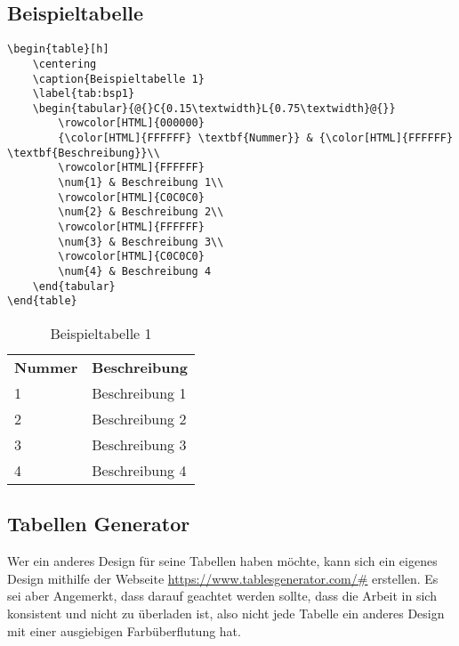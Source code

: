 \subsection{Beispieltabelle}
\begin{lstlisting}[style=latex]
\begin{table}[h]
	\centering
	\caption{Beispieltabelle 1}
	\label{tab:bsp1}
	\begin{tabular}{@{}C{0.15\textwidth}L{0.75\textwidth}@{}}
		\rowcolor[HTML]{000000} 
		{\color[HTML]{FFFFFF} \textbf{Nummer}} & {\color[HTML]{FFFFFF} \textbf{Beschreibung}}\\
		\rowcolor[HTML]{FFFFFF} 
		\num{1} & Beschreibung 1\\
		\rowcolor[HTML]{C0C0C0} 
		\num{2} & Beschreibung 2\\
		\rowcolor[HTML]{FFFFFF} 
		\num{3} & Beschreibung 3\\
		\rowcolor[HTML]{C0C0C0} 
		\num{4} & Beschreibung 4
	\end{tabular}
\end{table}
\end{lstlisting}
\begin{table}[h]
	\centering
	\caption{Beispieltabelle 1}
	\label{tab:bsp1}
	\begin{tabular}{@{}C{0.15\textwidth}L{0.75\textwidth}@{}}
		{\color[HTML]{FFFFFF} \textbf{Nummer}} & {\color[HTML]{FFFFFF} \textbf{Beschreibung}}\\
		
		\num{1} & Beschreibung 1\\
		
		\num{2} & Beschreibung 2\\
		
		\num{3} & Beschreibung 3\\
		
		\num{4} & Beschreibung 4
	\end{tabular}
\end{table}

\subsection{Tabellen Generator}
Wer ein anderes Design für seine Tabellen haben möchte, kann sich ein eigenes Design mithilfe der Webseite \url{https://www.tablesgenerator.com/#} erstellen. Es sei aber Angemerkt, dass darauf geachtet werden sollte, dass die Arbeit in sich konsistent und nicht zu überladen ist, also nicht jede Tabelle ein anderes Design mit einer ausgiebigen Farb\-über\-flut\-ung hat.

